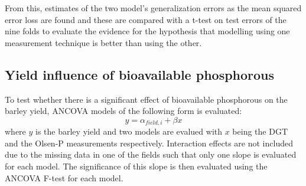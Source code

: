 \documentclass[12pt,fleqn]{article}
\begin{document}
From this, estimates of the two model's generalization errors as the mean squared error loss are found and these are compared with a t-test on test errors of the nine folds to evaluate the evidence for the hypothesis that modelling using one measurement technique is better than using the other.
\subsection{Yield influence of bioavailable phosphorous}
To test whether there is a significant effect of bioavailable phosphorous on the barley yield, ANCOVA models of the following form is evaluated:
\[
y = \alpha_{field, i} + \beta x
\]
where \(y\) is the barley yield and two models are evalued with \(x\) being the DGT and the Olsen-P measurements respectively. Interaction effects are not included due to the missing data in one of the fields such that only one slope is evaluated for each model. The significance of this slope is then evaluated using the ANCOVA F-test for each model.
\end{document}
